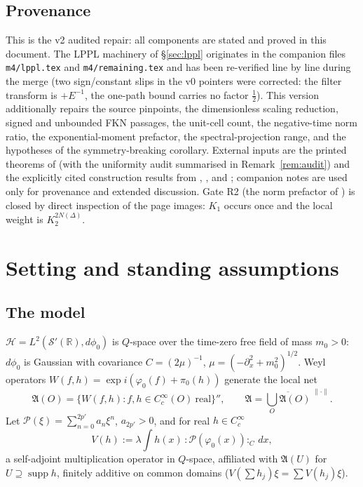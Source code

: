 \documentclass[11pt,a4paper]{article}
\theoremstyle{plain}
\theoremstyle{definition}
\newcommand{\R}{\mathbb{R}}
\newcommand{\A}{\mathfrak{A}}
\newcommand{\HH}{\mathcal{H}}
\DeclareMathOperator{\supp}{supp}
\begin{document}
\subsection*{Provenance}

This is the v2 audited repair: all components are stated and proved in this document. The LPPL machinery
of \S\ref{sec:lppl} originates in the companion files \texttt{m4/lppl.tex} and
\texttt{m4/remaining.tex} and has been re-verified line by line during the merge (two sign/constant
slips in the v0 pointers were corrected: the filter transform is $+E^{-1}$, the one-path bound
carries no factor $\tfrac12$). This version additionally repairs the source pinpoints, the
dimensionless scaling reduction, signed and unbounded FKN passages, the unit-cell count, the
negative-time norm ratio, the exponential-moment prefactor, the spectral-projection range, and
the hypotheses of the symmetry-breaking corollary. External inputs are the printed theorems of
\cite{GJS} (with the uniformity audit summarised in Remark~\ref{rem:audit}) and the explicitly
cited construction results from \cite{SimonBook}, \cite{GRS75}, and \cite{GJExp}; companion notes
are used only for provenance and extended discussion. Gate R2 (the norm prefactor of
\cite[(1.1.7)--(1.1.8)]{GJS}) is closed by direct inspection of the page images: $K_1$ occurs once
and the local weight is $K_2^{2N(\Delta)}$.

\section{Setting and standing assumptions}\label{sec:setting}

\subsection{The model}

$\HH=L^2(\mathcal S'(\R),d\phi_0)$ is $Q$-space over the time-zero free field of mass $m_0>0$:
$d\phi_0$ is Gaussian with covariance $C=(2\mu)^{-1}$, $\mu=(-\partial_x^2+m_0^2)^{1/2}$. Weyl
operators $W(f,h)=\exp i(\varphi_0(f)+\pi_0(h))$ generate the local net
\[
  \A(O)=\{W(f,h):f,h\in C_c^\infty(O)\ \text{real}\}'',\qquad
  \A=\overline{\textstyle\bigcup_O\A(O)}^{\;\|\cdot\|} .
\]
Let $\mathscr P(\xi)=\sum_{n=0}^{2p'}a_n\xi^n$, $a_{2p'}>0$, and for real $h\in C_c^\infty$
\[
  V(h):=\lambda\int h(x)\,{:}\mathscr P(\varphi_0(x)){:}_C\,dx ,
\]
a self-adjoint multiplication operator in $Q$-space, affiliated with $\A(U)$ for
$U\supseteq\supp h$, finitely additive on common domains ($V(\sum h_j)\xi=\sum V(h_j)\xi$).
\end{document}

